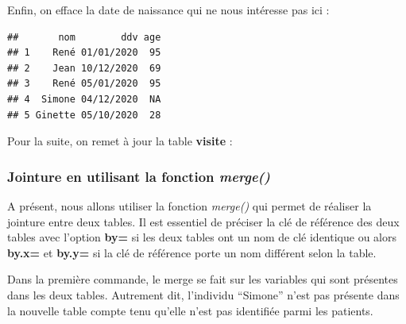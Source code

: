 \documentclass[
]{book}
\newenvironment{Shaded}{\begin{snugshade}}{\end{snugshade}}
\newcommand{\AttributeTok}[1]{\textcolor[rgb]{0.77,0.63,0.00}{#1}}
\newcommand{\ConstantTok}[1]{\textcolor[rgb]{0.00,0.00,0.00}{#1}}
\newcommand{\FunctionTok}[1]{\textcolor[rgb]{0.00,0.00,0.00}{#1}}
\newcommand{\NormalTok}[1]{#1}
\newcommand{\OtherTok}[1]{\textcolor[rgb]{0.56,0.35,0.01}{#1}}
\newcommand{\SpecialCharTok}[1]{\textcolor[rgb]{0.00,0.00,0.00}{#1}}
\newcommand{\StringTok}[1]{\textcolor[rgb]{0.31,0.60,0.02}{#1}}
\theoremstyle{definition}
\theoremstyle{definition}
\theoremstyle{definition}
\theoremstyle{definition}
\theoremstyle{remark}
\begin{document}
Enfin, on efface la date de naissance qui ne nous intéresse pas ici :

\begin{Shaded}
\end{Shaded}

\begin{verbatim}
##       nom        ddv age
## 1    René 01/01/2020  95
## 2    Jean 10/12/2020  69
## 3    René 05/01/2020  95
## 4  Simone 04/12/2020  NA
## 5 Ginette 05/10/2020  28
\end{verbatim}

Pour la suite, on remet à jour la table \textbf{visite} :

\begin{Shaded}
\end{Shaded}

\hypertarget{jointure-en-utilisant-la-fonction-merge}{%
\subsubsection{\texorpdfstring{Jointure en utilisant la fonction \emph{merge()}}{Jointure en utilisant la fonction merge()}}\label{jointure-en-utilisant-la-fonction-merge}}

A présent, nous allons utiliser la fonction \emph{merge()} qui permet de réaliser la jointure entre deux tables. Il est essentiel de préciser la clé de référence des deux tables avec l'option \textbf{by=} si les deux tables ont un nom de clé identique ou alors \textbf{by.x=} et \textbf{by.y=} si la clé de référence porte un nom différent selon la table.

Dans la première commande, le merge se fait sur les variables qui sont présentes dans les deux tables. Autrement dit, l'individu ``Simone'' n'est pas présente dans la nouvelle table compte tenu qu'elle n'est pas identifiée parmi les patients.

\begin{Shaded}
\end{Shaded}
\end{document}

